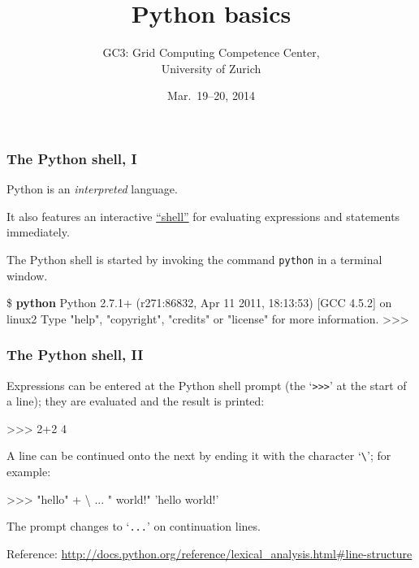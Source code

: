 \documentclass[english,serif,mathserif,xcolor=pdftex,dvipsnames,table]{beamer}
\title{%
  Python basics
}
\author[GC3]{%
  GC3: Grid Computing Competence Center, \\
  University of Zurich
}
\date{Mar.~19--20, 2014}
\begin{document}
\maketitle


\begin{frame}[fragile]
  \frametitle{The Python shell, I}
  Python is an \emph{interpreted} language.

  \+
  It also features an interactive
  \href{http://en.wikipedia.org/wiki/REPL}{``shell''} for evaluating
  expressions and statements immediately.

  \+
  The Python shell is started by invoking the command
  \texttt{python} in a terminal window.
\begin{semiverbatim}\small
\$ \textbf{python}
Python 2.7.1+ (r271:86832, Apr 11 2011, 18:13:53)
[GCC 4.5.2] on linux2
Type "help", "copyright", "credits" or "license"
for more information.
>>>
\end{semiverbatim}
\end{frame}

\begin{frame}[fragile]
  \frametitle{The Python shell, II}
  Expressions can be entered at the Python shell prompt (the
  `\texttt{>>>}' at the start of a line); they are evaluated and the
  result is printed:
\begin{semiverbatim}
>>> 2+2
4
\end{semiverbatim}

  \+
  A line can be continued onto the next by ending it with the
  character `\texttt{\textbackslash}'; for example:
\begin{semiverbatim}
>>> "hello" + \textbackslash
... " world!"
'hello world!'
\end{semiverbatim}
  The prompt changes to `\texttt{...}' on continuation lines.

  \+\scriptsize
  Reference:
  \url{http://docs.python.org/reference/lexical_analysis.html#line-structure}
\end{frame}
\end{document}
